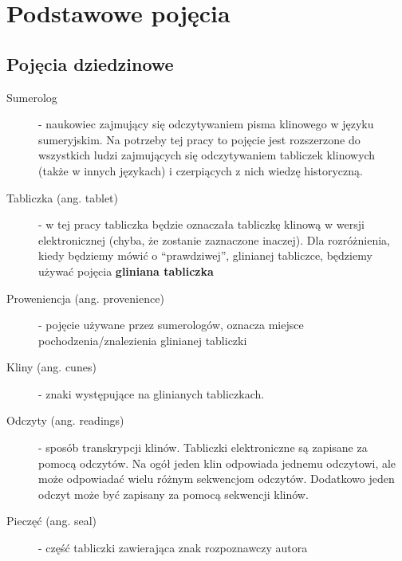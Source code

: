 \section{Podstawowe pojęcia}\label{r:pojecia}
\subsection{Pojęcia dziedzinowe}
\begin{description}
 \item[Sumerolog] - naukowiec zajmujący się odczytywaniem pisma klinowego w języku sumeryjskim. Na potrzeby tej pracy
		      to pojęcie jest rozszerzone do wszystkich ludzi zajmujących się odczytywaniem tabliczek klinowych (także w innych językach) i czerpiących z nich wiedzę historyczną.
 \item[Tabliczka (ang. tablet)] - w tej pracy tabliczka będzie oznaczała tabliczkę klinową w wersji elektronicznej 
		  (chyba, że zostanie zaznaczone inaczej). Dla rozróżnienia, kiedy będziemy mówić o ``prawdziwej'', 
		  glinianej tabliczce, będziemy używać pojęcia \textbf{gliniana tabliczka}
 \item[Proweniencja (ang. provenience)] - pojęcie używane przez sumerologów, oznacza miejsce pochodzenia/znalezienia glinianej tabliczki
 \item[Kliny (ang. cunes)] - znaki występujące na glinianych tabliczkach.
 \item[Odczyty (ang. readings)] - sposób transkrypcji klinów. Tabliczki elektroniczne są zapisane za pomocą odczytów. 
Na ogół jeden klin odpowiada jednemu odczytowi, ale może odpowiadać wielu różnym sekwencjom odczytów. 
Dodatkowo jeden odczyt może być zapisany za pomocą sekwencji klinów.
 \item[Pieczęć (ang. seal)] - część tabliczki zawierająca znak rozpoznawczy autora
\end{description}


